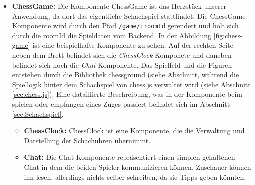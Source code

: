 \documentclass[a4paper,12pt]{report}
\begin{document}
\begin{itemize}
\item \textbf{ChessGame:} Die Komponente ChessGame ist das Herzstück unserer Anwendung, da dort das eigentliche Schachspiel stattfindet. Die ChessGame Komponente wird durch den Pfad \verb|/game/:roomId| gerendert und holt sich durch die roomId die Spieldaten vom Backend.  In der Abbildung \ref{fig:chess-game} ist eine beispielhafte Komponente zu sehen. Auf der rechten Seite neben dem Brett befindet sich die \textit{ChessClock} Komponete und daneben befindet sich noch die \textit{Chat} Komponente. Das Spielfeld und die Figuren entstehen durch die Bibliothek chessground (siehe Abschnitt, während die Spiellogik hinter dem Schachspiel von chess.js verwaltet wird (siehe Abschnitt \ref{sec:chess.js}). Eine dataillierte Beschreibung, was in der Komponente beim spielen oder empfangen eines Zuges passiert befindet sich im Abschnitt \ref{sec:Schachspiel}.

\begin{itemize}
\item \textbf{ChessClock:} ChessClock ist eine Komponente, die die Verwaltung und Darstellung der Schachuhren übernimmt.
\item \textbf{Chat:} Die Chat Komponente repräsentiert einen simplen gehaltenen Chat in dem die beiden Spieler kommunizieren können. Zuschauer können ihn lesen, allerdings nichts selber schreiben, da sie Tipps geben könnten.
\end{itemize}
\end{itemize}
        

    
    
\end{document}

